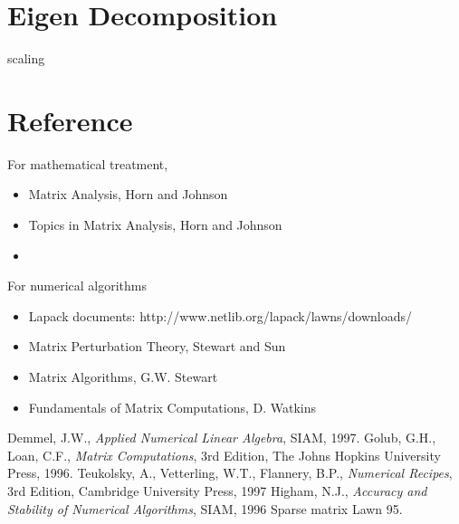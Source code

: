 \section{Eigen Decomposition}
scaling
\section{Reference}

For mathematical treatment, 
\begin{itemize}
\item Matrix Analysis, Horn and Johnson
\item Topics in Matrix Analysis, Horn and Johnson
\item 
\end{itemize}

For numerical algorithms
\begin{itemize}

\item Lapack documents: http://www.netlib.org/lapack/lawns/downloads/
\item Matrix Perturbation Theory, Stewart and Sun
\item Matrix Algorithms, G.W. Stewart
\item Fundamentals of Matrix Computations, D. Watkins
\end{itemize}

\begin{thebibliography}{99}

 Demmel, J.W., {\itshape Applied Numerical Linear Algebra},
 SIAM, 1997.
 Golub, G.H., Loan, C.F., {\itshape Matrix Computations},
 3rd Edition, The Johns Hopkins University Press, 1996.
 Teukolsky, A., Vetterling, W.T., Flannery, B.P., {\itshape Numerical Recipes}, 3rd Edition, Cambridge University Press, 1997
 Higham, N.J., {\itshape Accuracy and Stability of Numerical Algorithms}, SIAM, 1996
 Sparse matrix
 Lawn 95.


\end{thebibliography}
